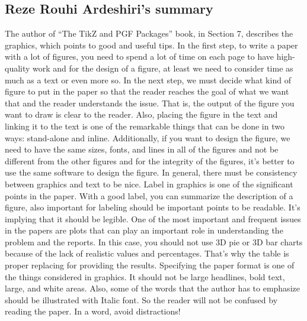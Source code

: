 \documentclass[paper=a4, fontsize=11pt]{scrartcl} %
\numberwithin{equation}{section} %
\numberwithin{figure}{section} %
\numberwithin{table}{section} %
\begin{document}
	\subsection{Reze Rouhi Ardeshiri's summary}
		The author of “The TikZ and PGF Packages” book, in Section 7, describes the graphics, which points to good and useful tips.\newline
		In the first step, to write a paper with a lot of figures, you need to spend a lot of time on each page to have high-quality work and for the design of a figure, at least we need to consider time as much as a text or even more so.\newline
		In the next step, we must decide what kind of figure to put in the paper so that the reader reaches the goal of what we want that and the reader understands the issue. That is, the output of the figure you want to draw is clear to the reader.\newline
		Also, placing the figure in the text and linking it to the text is one of the remarkable things that can be done in two ways: stand-alone and inline.\newline
		Additionally, if you want to design the figure, we need to have the same sizes, fonts, and lines in all of the figures and not be different from the other figures and for the integrity of the figures, it's better to use the same software to design the figure. In general, there must be consistency between graphics and text to be nice.\newline
		Label in graphics is one of the significant points in the paper. With a good label, you can summarize the description of a figure, also important for labeling should be important points to be readable. It’s implying that it should be legible.\newline
		One of the most important and frequent issues in the papers are plots that can play an important role in understanding the problem and the reports. In this case, you should not use 3D pie or 3D bar charts because of the lack of realistic values and percentages. That’s why the table is proper replacing for providing the results.\newline
		Specifying the paper format is one of the things considered in graphics. It should not be large headlines, bold text, large, and white areas. Also, some of the words that the author has to emphasize should be illustrated with Italic font. So the reader will not be confused by reading the paper. In a word, avoid distractions!
		
\end{document}
